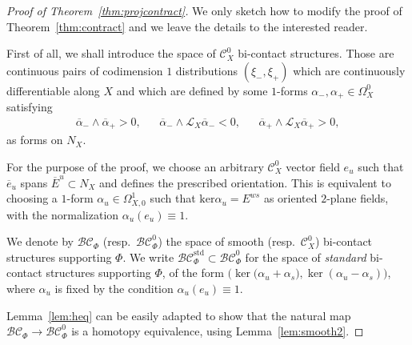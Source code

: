 \documentclass[letterpaper, 11pt]{article}
\numberwithin{equation}{section}
\begin{document}
\begin{proof}[Proof of Theorem~\ref{thm:projcontract}] We only sketch how to modify the proof of Theorem~\ref{thm:contract} and we leave the details to the interested reader.

First of all, we shall introduce the space of $\mathcal{C}^0_X$ bi-contact structures. Those are continuous pairs of codimension $1$ distributions $(\xi_-, \xi_+)$ which are continuously differentiable along $X$ and which are defined by some $1$-forms $\alpha_-, \alpha_+ \in \Omega^0_X$ satisfying
\begin{align} \label{eq:weakcont}
\overline{\alpha}_- \wedge \overline{\alpha}_+ > 0, & &\overline{\alpha}_- \wedge \mathcal{L}_X \overline{\alpha}_- < 0, & &\overline{\alpha}_+ \wedge \mathcal{L}_X \overline{\alpha}_+ > 0,
\end{align}
as forms on $N_X$. 

For the purpose of the proof, we choose an arbitrary $\mathcal{C}^0_X$ vector field $e_u$ such that $\overline{e}_u$ spans $\overline{E}^u \subset N_X$ and defines the prescribed orientation. This is equivalent to choosing a $1$-form $\alpha_u \in \Omega^1_{X,0}$ such that $\mathrm{ker} \alpha_u = E^{ws}$ as oriented $2$-plane fields, with the normalization $\alpha_u(e_u) \equiv 1$.

We denote by $\mathcal{BC}_\Phi$ (resp.~$\mathcal{BC}^0_\Phi$) the space of smooth (resp.~$\mathcal{C}^0_X$) bi-contact structures supporting $\Phi$. We write $\mathcal{BC}^\mathrm{std}_\Phi \subset \mathcal{BC}^0_\Phi$ for the space of \emph{standard} bi-contact structures supporting $\Phi$, of the form $\big(\ker \big( \alpha_u + \alpha_s \big), \ker \left( \alpha_u - \alpha_s \right) \big)$, where $\alpha_u$ is fixed by the condition $\alpha_u(e_u) \equiv 1$.

Lemma~\ref{lem:heq} can be easily adapted to show that the natural map $\mathcal{BC}_\Phi \rightarrow \mathcal{BC}^0_\Phi$ is a homotopy equivalence, using Lemma~\ref{lem:smooth2}.


\end{proof}
\end{document}
